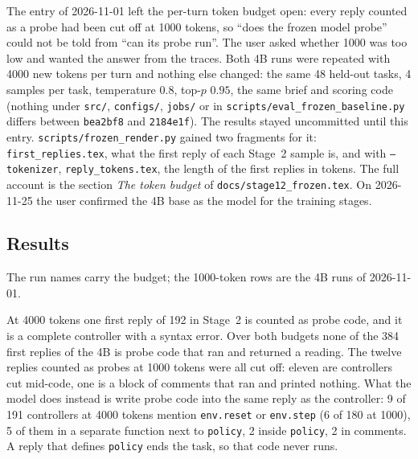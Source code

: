 \documentclass[11pt,a4paper]{article}
\begin{document}
The entry of 2026-11-01 left the per-turn token budget open: every reply
counted as a probe had been cut off at 1000 tokens, so ``does the frozen model
probe'' could not be told from ``can its probe run''. The user asked whether
1000 was too low and wanted the answer from the traces. Both 4B runs were
repeated with 4000 new tokens per turn and nothing else changed: the same 48
held-out tasks, 4 samples per task, temperature $0.8$, top-$p$ $0.95$, the same
brief and scoring code (nothing under \texttt{src/}, \texttt{configs/},
\texttt{jobs/} or in \texttt{scripts/eval\_frozen\_baseline.py} differs
between \texttt{bea2bf8} and \texttt{2184e1f}). The results stayed uncommitted
until this entry. \texttt{scripts/frozen\_render.py} gained two fragments for
it: \texttt{first\_replies.tex}, what the first reply of each Stage~2 sample
is, and with \texttt{--tokenizer}, \texttt{reply\_tokens.tex}, the length of
the first replies in tokens. The full account is the section \emph{The token
budget} of \texttt{docs/stage12\_frozen.tex}. On 2026-11-25 the user confirmed
the 4B base as the model for the training stages.

\subsection*{Results}

The run names carry the budget; the 1000-token rows are the 4B runs of
2026-11-01.

\begin{center}\small
\resizebox{\linewidth}{!}{}
\end{center}

\begin{center}\small
\resizebox{\linewidth}{!}{}
\end{center}

\begin{center}\small

\end{center}

At 4000 tokens one first reply of 192 in Stage~2 is counted as probe code,
and it is a complete controller with a syntax error. Over both budgets none
of the 384 first replies of the 4B is probe code that ran and returned a
reading. The twelve replies counted as probes at 1000 tokens were all cut
off: eleven are controllers cut mid-code, one is a block of comments that
ran and printed nothing. What the model does instead is write probe code
into the same reply as the controller: 9 of 191 controllers at 4000 tokens
mention \texttt{env.reset} or \texttt{env.step} (6 of 180 at 1000), 5 of
them in a separate function next to \texttt{policy}, 2 inside
\texttt{policy}, 2 in comments. A reply that defines \texttt{policy} ends
the task, so that code never runs.
\end{document}
